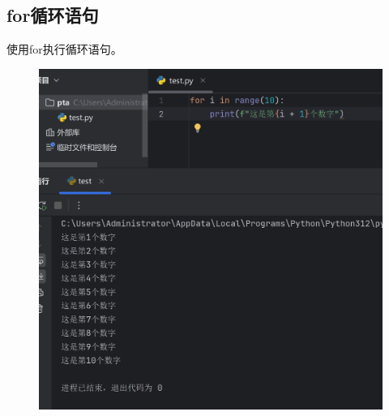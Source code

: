 \documentclass{article}
\begin{document}
\subsection{for循环语句}
使用for执行循环语句。
\begin{figure}[H]
    \centering
    \includegraphics[width=1\linewidth]{for.png}
\end{figure}


\newpage
\end{document}

